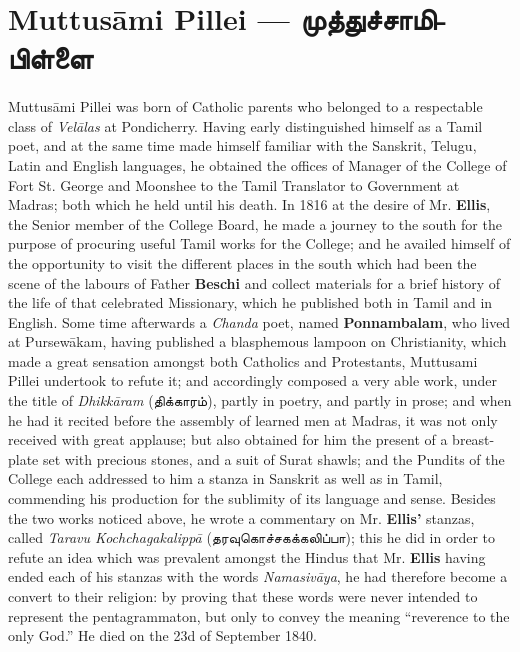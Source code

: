 \documentclass{article}
\newcommand{\TamilText}[1]{\texttamil{#1}}
\newcommand{\TamilBold}[1]{\texttamil{\textbf{#1}}}
\newcommand{\tam}[1]{\TamilText{#1}}
\newcommand{\tambold}[1]{\TamilBold{#1}}
\begin{document}
\section{Muttus\={a}mi Pillei --- \tambold{முத்துச்சாமிபிள்ளை}}
\paragraph{}
Muttus\={a}mi Pillei was born of Catholic parents who belonged to a respectable class of \emph{Vel\={a}las} at Pondicherry. Having early distinguished himself as a Tamil poet, and at the same time made himself familiar with the Sanskrit, Telugu, Latin and English languages, he obtained the offices of Manager of the College of Fort St. George and Moonshee to the Tamil Translator to Government at Madras; both which he held until his death. In 1816 at the desire of Mr. \textbf{Ellis}, the Senior member of the College Board, he made a journey to the south for the purpose of procuring useful Tamil works for the College; and he availed himself of the opportunity to visit the different places in the south which had been the scene of the labours of Father \textbf{Beschi} and collect materials for a brief history of the life of that celebrated Missionary, which he published both in Tamil and in English. Some time afterwards a \emph{Chanda} poet, named \textbf{Ponnambalam}, who lived at Pursew\={a}kam, having published a blasphemous lampoon on Christianity, which made a great sensation amongst both Catholics and Protestants, Muttusami Pillei undertook to refute it; and accordingly composed a very able work, under the title of \emph{Dhikk\={a}ram} (\tam{திக்காரம்}), partly in poetry, and partly in prose; and when he had it recited before the assembly of learned men at Madras, it was not only received with great applause; but also obtained for him the present of a breast-plate set with precious stones, and a suit of Surat shawls; and the Pundits of the College each addressed to him a stanza in Sanskrit as well as in Tamil, commending his production for the sublimity of its language and sense. Besides the two works noticed above, he wrote a commentary on Mr. \textbf{Ellis'} stanzas, called \emph{Taravu Kochchagakalipp\={a}} (\tam{தரவுகொச்சகக்கலிப்பா}); this he did in order to refute an idea which was prevalent amongst the Hindus that Mr. \textbf{Ellis} having ended each of his stanzas with the words \emph{Namasiv\={a}ya}, he had therefore become a convert to their religion: by proving that these words were never intended to represent the pentagrammaton, but only to convey the meaning ``reverence to the only God.'' He died on the 23d of September 1840.
\end{document}
